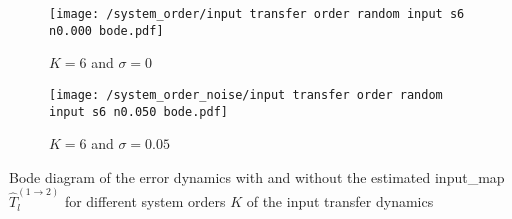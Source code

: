 \begin{example}
\begin{minipage}{1\textwidth}
       \medskip  
       \begin{subfigure}{0.495\textwidth}
           \centering
           \texttt{[image: /system\_order/input transfer order random input s6 n0.000 bode.pdf]}
           \caption{$K = 6$ and $\sigma = 0$}
           \label{subfigapp:tf_order_m}
       \end{subfigure} 
       \hfill
       \begin{subfigure}{0.495\textwidth}
           \centering
           \texttt{[image: /system\_order\_noise/input transfer order random input s6 n0.050 bode.pdf]}
           \caption{$K = 6$ and $\sigma = 0.05$}
           \label{subfigapp:tf_order_n}
       \end{subfigure} 
       \caption[System Order of Transfer Maps Example (Bode Plot of the Transfer Error Dynamics)]{Bode diagram of the error dynamics with and without the estimated \gls*{input_map} $\hat{T}^{(1 \rightarrow 2)}_{l}$ for different system orders $K$ of the input transfer dynamics}
       \label{figapp:input_transfer_order}
\end{minipage}
\endgroup
\end{example} 





